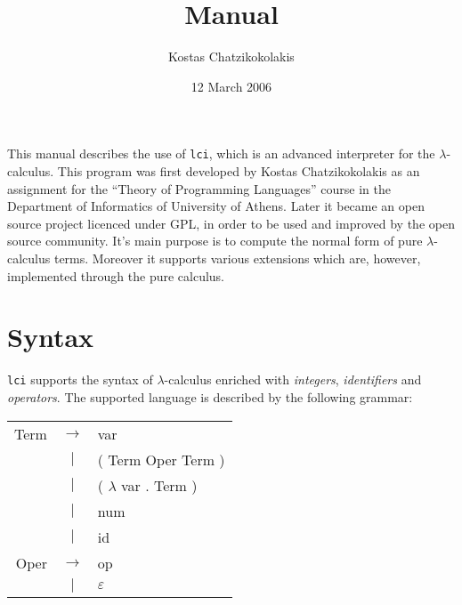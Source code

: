 \documentclass[a4paper,11pt]{article}
\author{
	Kostas Chatzikokolakis
}
\title{
	\kwd{lci} Manual
}
\date{12 March 2006}
\newcommand{\la}{$\lambda$}
\newcommand{\lci}{\texttt{lci}}
\newcommand{\lc}{$\lambda$-calculus}
\newcommand{\qm}[1]{``#1''}
\begin{document}
\maketitle
\vspace{60pt}

This manual describes the use of \lci{}, which is an advanced
interpreter for the \lc. This program was first developed by Kostas
Chatzikokolakis as an assignment for the \qm{Theory of Programming Languages} course
in the Department of Informatics of University of Athens. Later it became an
open source project licenced under GPL, in order to be used and improved by
the open source community. It's main purpose is to compute the normal form of
pure \lc{} terms. Moreover it supports various extensions which are, however,
implemented through the pure calculus.

\section{Syntax}
\lci{} supports the syntax of \lc{} enriched with \emph{integers}, \emph{identifiers}
and \emph{operators}. The supported language is described by the following grammar:

\begin{center}
	\begin{tabular}{rcl}
		Term	& $\rightarrow$ & var \\
		& $|$ & ( Term Oper Term ) \\
		& $|$ & ( \la{} var . Term ) \\
		& $|$ & num \\
		& $|$ & id \\
		Oper & $\rightarrow$ & op \\
		& $|$ & $\varepsilon$
	\end{tabular}
\end{center}
\end{document}

